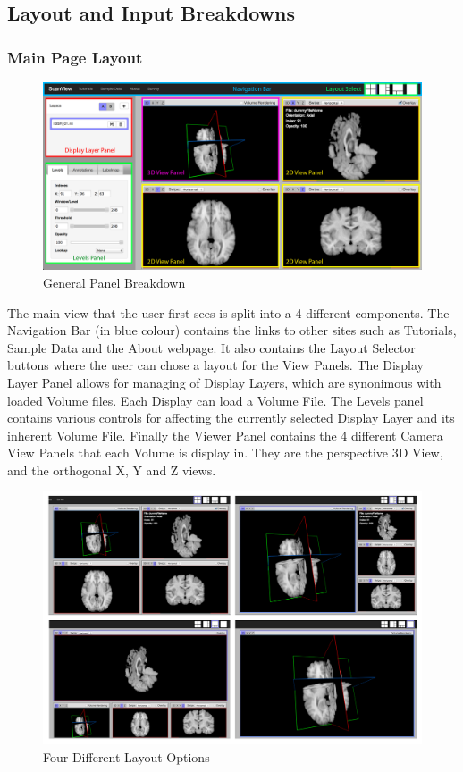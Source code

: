 \documentclass[a4paper,11pt,titlepage]{article}
\begin{document}
\subsection{Layout and Input Breakdowns}

\subsubsection{Main Page Layout}

\begin{figure}[ht!]
\centering
\includegraphics[width=170mm]{graphics/features_01.png}
\caption{General Panel Breakdown}
\label{fig:UIdesign1}
\end{figure}

The main view that the user first sees is split into a 4 different components. The Navigation Bar (in blue colour) contains the links to other sites such as Tutorials, Sample Data and the About webpage. It also contains the Layout Selector buttons where the user can chose a layout for the View Panels. The Display Layer Panel allows for managing of Display Layers, which are synonimous with loaded Volume files. Each Display can load a Volume File. The Levels panel contains various controls for affecting the currently selected Display Layer and its inherent Volume File. Finally the Viewer Panel contains the 4 different Camera View Panels that each Volume is display in. They are the perspective 3D View, and the orthogonal X, Y and Z views.



\begin{figure}[ht!]
\centering
\includegraphics[width=170mm]{graphics/layouts_01.png}
\caption{Four Different Layout Options}
\label{fig:UIdesign1}
\end{figure}
\end{document}
